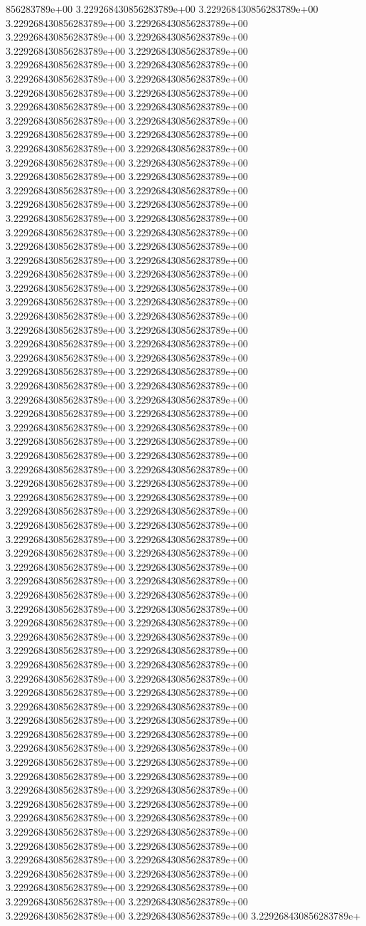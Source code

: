 856283789e+00	3.229268430856283789e+00	3.229268430856283789e+00	3.229268430856283789e+00	3.229268430856283789e+00	3.229268430856283789e+00	3.229268430856283789e+00	3.229268430856283789e+00	3.229268430856283789e+00	3.229268430856283789e+00	3.229268430856283789e+00	3.229268430856283789e+00	3.229268430856283789e+00	3.229268430856283789e+00	3.229268430856283789e+00	3.229268430856283789e+00	3.229268430856283789e+00	3.229268430856283789e+00	3.229268430856283789e+00	3.229268430856283789e+00	3.229268430856283789e+00	3.229268430856283789e+00	3.229268430856283789e+00	3.229268430856283789e+00	3.229268430856283789e+00	3.229268430856283789e+00	3.229268430856283789e+00	3.229268430856283789e+00	3.229268430856283789e+00	3.229268430856283789e+00	3.229268430856283789e+00	3.229268430856283789e+00	3.229268430856283789e+00	3.229268430856283789e+00	3.229268430856283789e+00	3.229268430856283789e+00	3.229268430856283789e+00	3.229268430856283789e+00	3.229268430856283789e+00	3.229268430856283789e+00	3.229268430856283789e+00	3.229268430856283789e+00	3.229268430856283789e+00	3.229268430856283789e+00	3.229268430856283789e+00	3.229268430856283789e+00	3.229268430856283789e+00	3.229268430856283789e+00	3.229268430856283789e+00	3.229268430856283789e+00	3.229268430856283789e+00	3.229268430856283789e+00	3.229268430856283789e+00	3.229268430856283789e+00	3.229268430856283789e+00	3.229268430856283789e+00	3.229268430856283789e+00	3.229268430856283789e+00	3.229268430856283789e+00	3.229268430856283789e+00	3.229268430856283789e+00	3.229268430856283789e+00	3.229268430856283789e+00	3.229268430856283789e+00	3.229268430856283789e+00	3.229268430856283789e+00	3.229268430856283789e+00	3.229268430856283789e+00	3.229268430856283789e+00	3.229268430856283789e+00	3.229268430856283789e+00	3.229268430856283789e+00	3.229268430856283789e+00	3.229268430856283789e+00	3.229268430856283789e+00	3.229268430856283789e+00	3.229268430856283789e+00	3.229268430856283789e+00	3.229268430856283789e+00	3.229268430856283789e+00	3.229268430856283789e+00	3.229268430856283789e+00	3.229268430856283789e+00	3.229268430856283789e+00	3.229268430856283789e+00	3.229268430856283789e+00	3.229268430856283789e+00	3.229268430856283789e+00	3.229268430856283789e+00	3.229268430856283789e+00	3.229268430856283789e+00	3.229268430856283789e+00	3.229268430856283789e+00	3.229268430856283789e+00	3.229268430856283789e+00	3.229268430856283789e+00	3.229268430856283789e+00	3.229268430856283789e+00	3.229268430856283789e+00	3.229268430856283789e+00	3.229268430856283789e+00	3.229268430856283789e+00	3.229268430856283789e+00	3.229268430856283789e+00	3.229268430856283789e+00	3.229268430856283789e+00	3.229268430856283789e+00	3.229268430856283789e+00	3.229268430856283789e+00	3.229268430856283789e+00	3.229268430856283789e+00	3.229268430856283789e+00	3.229268430856283789e+00	3.229268430856283789e+00	3.229268430856283789e+00	3.229268430856283789e+00	3.229268430856283789e+00	3.229268430856283789e+00	3.229268430856283789e+00	3.229268430856283789e+00	3.229268430856283789e+00	3.229268430856283789e+00	3.229268430856283789e+00	3.229268430856283789e+00	3.229268430856283789e+00	3.229268430856283789e+00	3.229268430856283789e+00	3.229268430856283789e+00	3.229268430856283789e+00	3.229268430856283789e+00	3.229268430856283789e+00	3.229268430856283789e+00	3.229268430856283789e+00	3.229268430856283789e+